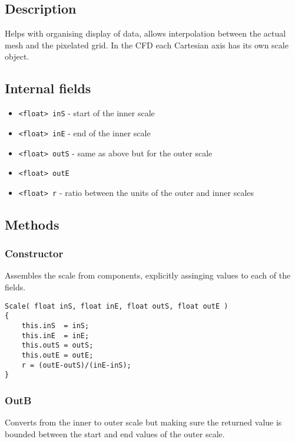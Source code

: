 \documentclass[notitlepage]{article}
\begin{document}
\subsection{Description}

Helps with organising display of data, allows interpolation between the actual mesh
and the pixelated grid. In the CFD each Cartesian axis has its own scale object.

\subsection{Internal fields}

\begin{itemize}
\item \texttt{<float> inS} - start of the inner scale
\item \texttt{<float> inE} - end of the inner scale
\item \texttt{<float> outS} - same as above but for the outer scale
\item \texttt{<float> outE}
\item \texttt{<float> r} - ratio between the units of the outer and inner scales
\end{itemize}

\subsection{Methods}

\subsubsection{Constructor}

Assembles the scale from components, explicitly assinging values to each of the fields.

\begin{lstlisting}[style=myCpp]
Scale( float inS, float inE, float outS, float outE )
{
	this.inS  = inS;
	this.inE  = inE;
	this.outS = outS;
	this.outE = outE;
	r = (outE-outS)/(inE-inS);
}
\end{lstlisting}

\subsubsection{OutB}

Converts from the inner to outer scale but making sure the returned value is
bounded between the start and end values of the outer scale.
\end{document}

